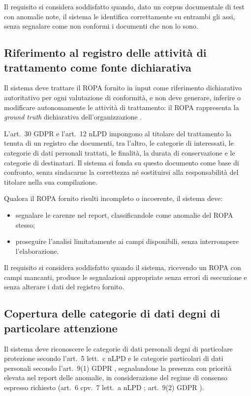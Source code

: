 Il requisito si considera soddisfatto quando, dato un corpus documentale di test con anomalie note, il sistema le identifica correttamente su entrambi gli assi, senza segnalare come non conformi i documenti che non lo sono.

\subsection{Riferimento al registro delle attività di trattamento come fonte dichiarativa}
\label{sub:ropa-fonte-normativa}
Il sistema deve trattare il ROPA fornito in input come riferimento dichiarativo autoritativo per ogni valutazione di conformità, e non deve generare, inferire o modificare autonomamente le attività di trattamento: il ROPA rappresenta la \textit{ground truth} dichiarativa dell'organizzazione \cite{amaralNLPbasedAutomatedCompliance2023}. \medskip

L'art.~30 GDPR \cite{RegolamentoUE20162016} e l'art.~12 nLPD \cite{RS2351Legge} impongono al titolare del trattamento la tenuta di un registro che documenti, tra l'altro, le categorie di interessati, le categorie di dati personali trattati, le finalità, la durata di conservazione e le categorie di destinatari. Il sistema si fonda su questo documento come base di confronto, senza sindacarne la correttezza né sostituirsi alla responsabilità del titolare nella sua compilazione. \medskip

Qualora il ROPA fornito risulti incompleto o incoerente, il sistema deve:
\begin{itemize}
	\item segnalare le carenze nel report, classificandole come anomalie del ROPA stesso;
	\item proseguire l'analisi limitatamente ai campi disponibili, senza interrompere l'elaborazione.
\end{itemize} \medskip

Il requisito si considera soddisfatto quando il sistema, ricevendo un ROPA con campi mancanti, produce le segnalazioni appropriate senza errori di esecuzione e senza alterare i dati del registro fornito.

\subsection{Copertura delle categorie di dati degni di particolare attenzione}
\label{sub:dati-particolari}
Il sistema deve riconoscere le categorie di dati personali degni di particolare protezione secondo l'art.~5 lett.~c nLPD \cite{RS2351Legge} e le categorie particolari di dati personali secondo l'art.~9(1) GDPR \cite{RegolamentoUE20162016}, segnalandone la presenza con priorità elevata nel report delle anomalie, in considerazione del regime di consenso espresso richiesto (art.~6 cpv.~7 lett.~a nLPD \cite{RS2351Legge}; art.~9(2) GDPR \cite{RegolamentoUE20162016}).

